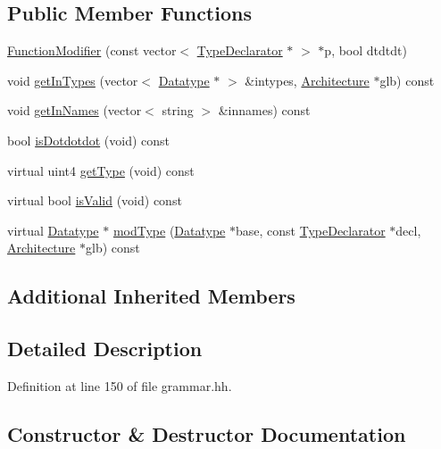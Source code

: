 \subsection*{Public Member Functions}
\begin{DoxyCompactItemize}
\item 
\mbox{\hyperlink{class_function_modifier_a2fcd1f1ff54fea301ab932fd3caed809}{Function\+Modifier}} (const vector$<$ \mbox{\hyperlink{class_type_declarator}{Type\+Declarator}} $\ast$ $>$ $\ast$p, bool dtdtdt)
\item 
void \mbox{\hyperlink{class_function_modifier_adc403e7630c661e26e98fd804778df4c}{get\+In\+Types}} (vector$<$ \mbox{\hyperlink{class_datatype}{Datatype}} $\ast$ $>$ \&intypes, \mbox{\hyperlink{class_architecture}{Architecture}} $\ast$glb) const
\item 
void \mbox{\hyperlink{class_function_modifier_aeffb53f85aa72f9a66da32258bb3d1f6}{get\+In\+Names}} (vector$<$ string $>$ \&innames) const
\item 
bool \mbox{\hyperlink{class_function_modifier_a82d55cae0f01c43840d22a3ca4dd61c1}{is\+Dotdotdot}} (void) const
\item 
virtual uint4 \mbox{\hyperlink{class_function_modifier_a3d9dd30cfeee023391479e84b57e0c91}{get\+Type}} (void) const
\item 
virtual bool \mbox{\hyperlink{class_function_modifier_a3ce17649de258e786a221834a225e806}{is\+Valid}} (void) const
\item 
virtual \mbox{\hyperlink{class_datatype}{Datatype}} $\ast$ \mbox{\hyperlink{class_function_modifier_ac60a79708a408ad683a70e6f3310394c}{mod\+Type}} (\mbox{\hyperlink{class_datatype}{Datatype}} $\ast$base, const \mbox{\hyperlink{class_type_declarator}{Type\+Declarator}} $\ast$decl, \mbox{\hyperlink{class_architecture}{Architecture}} $\ast$glb) const
\end{DoxyCompactItemize}
\subsection*{Additional Inherited Members}


\subsection{Detailed Description}


Definition at line 150 of file grammar.\+hh.



\subsection{Constructor \& Destructor Documentation}
\mbox{\label{class_function_modifier_a2fcd1f1ff54fea301ab932fd3caed809}} 
